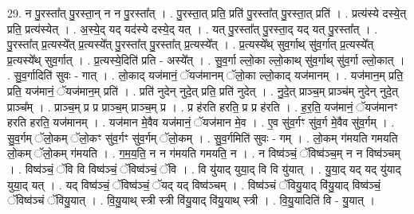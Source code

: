 \documentclass[17pt]{extarticle}
\begin{document}
29. न पु॒रस्ता᳚त् पु॒रस्ता॒न् न न पु॒रस्ता᳚त् । . पु॒रस्ता॒त् प्रति॒ प्रति॑ पु॒रस्ता᳚त् पु॒रस्ता॒त् प्रति॑ । . प्रत्य॑स्ये दस्ये॒त् प्रति॒ प्रत्य॑स्येत् । . अ॒स्ये॒द् यद् यद॑स्ये दस्ये॒द् यत् । . यत् पु॒रस्ता᳚त् पु॒रस्ता॒द् यद् यत् पु॒रस्ता᳚त् । . पु॒रस्ता᳚त् प्र॒त्यस्ये᳚त् प्र॒त्यस्ये᳚त् पु॒रस्ता᳚त् पु॒रस्ता᳚त् प्र॒त्यस्ये᳚त् । . प्र॒त्यस्ये᳚थ् सुव॒र्गाथ् सु॑व॒र्गात् प्र॒त्यस्ये᳚त् प्र॒त्यस्ये᳚थ् सुव॒र्गात् । . प्र॒त्यस्ये॒दिति॑ प्रति - अस्ये᳚त् । . सु॒व॒र्गा ल्लो॒का ल्लो॒काथ् सु॑व॒र्गाथ् सु॑व॒र्गा ल्लो॒कात् । . सु॒व॒र्गादिति॑ सुवः - गात् । . लो॒काद् यज॑मानं॒ ॅयज॑मानम् ॅलो॒का ल्लो॒काद् यज॑मानम् । . यज॑मान॒म् प्रति॒ प्रति॒ यज॑मानं॒ ॅयज॑मान॒म् प्रति॑ । . प्रति॑ नुदेन् नुदे॒त् प्रति॒ प्रति॑ नुदेत् । . नु॒दे॒त् प्राञ्च॒म् प्राञ्च॑म् नुदेन् नुदे॒त् प्राञ्च᳚म् । . प्राञ्च॒म् प्र प्र प्राञ्च॒म् प्राञ्च॒म् प्र । . प्र ह॑रति हरति॒ प्र प्र ह॑रति । . ह॒र॒ति॒ यज॑मानं॒ ॅयज॑मानꣳ हरति हरति॒ यज॑मानम् । . यज॑मान मे॒वैव यज॑मानं॒ ॅयज॑मान मे॒व । . ए॒व सु॑व॒र्गꣳ सु॑व॒र्ग मे॒वैव सु॑व॒र्गम् । . सु॒व॒र्गम् ॅलो॒कम् ॅलो॒कꣳ सु॑व॒र्गꣳ सु॑व॒र्गम् ॅलो॒कम् । . सु॒व॒र्गमिति॑ सुवः - गम् । . लो॒कम् ग॑मयति गमयति लो॒कम् ॅलो॒कम् ग॑मयति । . ग॒म॒य॒ति॒ न न ग॑मयति गमयति॒ न । . न विष्व॑ञ्चं॒ ॅविष्व॑ञ्च॒म् न न विष्व॑ञ्चम् । . विष्व॑ञ्चं॒ ॅवि वि विष्व॑ञ्चं॒ ॅविष्व॑ञ्चं॒ ॅवि । . वि यु॑याद् युया॒द् वि वि यु॑यात् । . यु॒या॒द् यद् यद् यु॑याद् युया॒द् यत् । . यद् विष्व॑ञ्चं॒ ॅविष्व॑ञ्चं॒ ॅयद् यद् विष्व॑ञ्चम् । . विष्व॑ञ्चं ॅवियु॒याद् वि॑यु॒याद् विष्व॑ञ्चं॒ ॅविष्व॑ञ्चं ॅवियु॒यात् । . वि॒यु॒याथ् स्त्री स्त्री वि॑यु॒याद् वि॑यु॒याथ् स्त्री । . वि॒यु॒यादिति॑ वि - यु॒यात् । \newline
\end{document}
